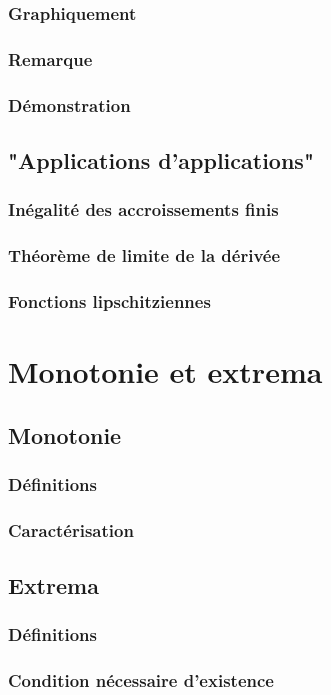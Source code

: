 \documentclass[12pt,a4paper,french]{book}
\begin{document}
			\subsubsection{Graphiquement}
			\subsubsection{Remarque}
			\subsubsection{Démonstration}
		\subsection{"Applications d'applications"}
			\subsubsection{Inégalité des accroissements finis}
			\subsubsection{Théorème de limite de la dérivée}
			\subsubsection{Fonctions lipschitziennes}
	\section{Monotonie et extrema}
		\subsection{Monotonie}
			\subsubsection{Définitions}
			\subsubsection{Caractérisation}
		\subsection{Extrema}
			\subsubsection{Définitions}
			\subsubsection{Condition nécessaire d'existence}
\end{document}
